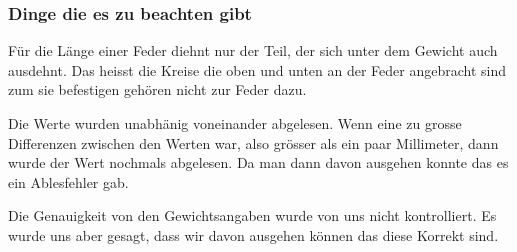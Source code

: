\documentclass[../main.tex]{subfiles} %
\begin{document}
        \subsubsection{Dinge die es zu beachten gibt}\label{subsubsec:dinge-die-es-zu-beachten-gibt}
        Für die Länge einer Feder diehnt nur der Teil, der sich unter dem Gewicht auch ausdehnt.
        Das heisst die Kreise die oben und unten an der Feder angebracht sind zum sie befestigen gehören nicht zur Feder dazu.
        \begin{tcolorbox}[title=Hinweis beim Ablesen]
            Die Werte wurden unabhänig voneinander abgelesen.
            Wenn eine zu grosse Differenzen zwischen den Werten war, also grösser als ein paar Millimeter, dann wurde der Wert nochmals abgelesen.
            Da man dann davon ausgehen konnte das es ein Ablesfehler gab.
        \end{tcolorbox}
        \begin{tcolorbox}[title=Hinweis zu den Gewichtsangeben]
            Die Genauigkeit von den Gewichtsangaben wurde von uns nicht kontrolliert.
            Es wurde uns aber gesagt, dass wir davon ausgehen können das diese Korrekt sind.
        \end{tcolorbox}
\end{document}
